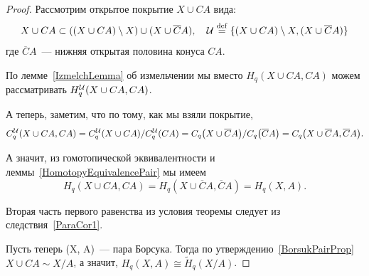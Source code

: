     \begin{proof}
        Рассмотрим открытое покрытие $X \cup CA$ вида:
        \[ X \cup CA \subset ((X \cup CA)\setminus X) \cup (X \cup \overline{C}A), \quad \mathcal{U} \stackrel{\mathrm{def}}{=} \{ (X \cup CA)\setminus X, (X \cup \overline{C}A) \} \]
        где $\overline{C}A$~--- нижняя открытая половина конуса $CA$.

        По лемме~\ref{IzmelchLemma} об измельчении мы вместо $H_{q}(X \cup CA, CA)$ можем рассматривать $H_{q}^{\mathcal{U}}(X \cup CA, CA)$.

        А теперь, заметим, что по тому, как мы взяли покрытие,
        \[ C_{q}^{\cU}(X \cup CA, CA) = C_{q}^{\cU}(X \cup CA)/C_{q}^{\cU}(CA) = C_{q}\lr*{X \cup \overline{C}A}/C_{q}\lr*{\overline{C}A} = C_{q}\lr*{X \cup \overline{C}A, \overline{C}A}. \]

        А значит, из гомотопической эквивалентности и леммы~\ref{HomotopyEquivalencePair} мы имеем
        \[ H_{q}(X \cup CA, CA) = H_{q}(X \cup \overline{C}A, \overline{C}A) = H_{q}(X, A). \]

        Вторая часть первого равенства из условия теоремы следует из следствия~\ref{ParaCor1}.

        Пусть теперь (X, A)~--- пара Борсука. Тогда по утверждению~\ref{BorsukPairProp} $X \cup CA \sim X/A$, а значит,
        $H_{q}(X, A) \cong \widetilde{H}_{q}(X/A)$.
    \end{proof}
